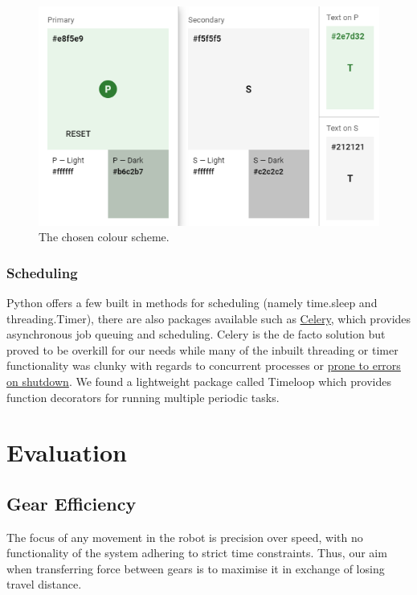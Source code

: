 \documentclass{article}
\begin{document}
\begin{figure}[h]
\begin{center}
\includegraphics[width=\columnwidth]{figs-demo2/colourscheme.png}
\caption{The chosen colour scheme.}
\label{fig:colourscheme}
\end{center}
\vskip -5mm
\end{figure}

\subsubsection{Scheduling}
Python offers a few built in methods for scheduling (namely time.sleep and threading.Timer), there are also packages available such as \href{https://docs.celeryproject.org/en/stable/getting-started/introduction.html}{Celery}, which provides asynchronous job queuing and scheduling. Celery is the de facto solution but proved to be overkill for our needs while many of the inbuilt threading or timer functionality was clunky with regards to concurrent processes or \href{https://stackoverflow.com/questions/25676835/signal-handling-in-multi-threaded-python}{prone to errors on shutdown}. We found a lightweight package called Timeloop which provides function decorators for running multiple periodic tasks.


\section{Evaluation}

\subsection{Gear Efficiency}

The focus of any movement in the robot is precision over speed, with no functionality of the system adhering to strict time constraints. Thus, our aim when transferring force between gears is to maximise it in exchange of losing travel distance.
\end{document}
